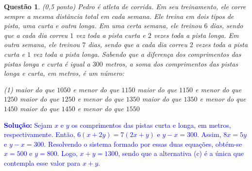 \documentclass[oneside,a4paper,12pt]{article}
\newcommand{\negrito}[1]{\mbox{\boldmath{$#1$}}}
\theoremstyle{Colorido}
\theoremstyle{solu}
\theoremstyle{dotlessP}
\newtheorem{sol}{Questão}
\begin{document}
	\begin{sol}
\textit{(0,5 ponto)} \newline \newline
Pedro é atleta de corrida. Em seu treinamento, ele corre sempre a mesma distância total em cada semana. Ele treina em dois tipos de pista, uma curta e outra longa. Em uma certa semana, ele treinou $6$ dias, sendo que a cada dia correu $1$ vez toda a pista curta e $2$ vezes toda a pista longa. Em outra semana, ele treinou $7$ dias, sendo que a cada dia correu $2$ vezes toda a pista curta e $1$ vez toda a pista longa. Sabendo que a diferença dos comprimentos das pistas longa e curta é igual a $300$ metros, a soma dos comprimentos das pistas longa e curta, em metros, é um número:
\begin{tasks}[counter-format={(tsk[a])},label-width=3.6ex, label-format = {\bfseries}, column-sep = {20pt}](1)
\task[\textcolor{blue}{$\negrito{(a)} $}] maior do que $1050$ e menor do que $1150$
\task[\textcolor{blue}{$\negrito{(b)} $}] maior do que $1150$ e menor do que $1250$
\task[\textcolor{blue}{$\negrito{(c)} $}] maior do que $1250$ e menor do que $1350$      
\task[\textcolor{blue}{$\negrito{(d)} $}] maior do que $1350$ e menor do que $1450$
\task[\textcolor{blue}{$\negrito{(e)} $}] maior do que $1450$ e menor do que $1550$
\end{tasks}
\end{sol}
\textcolor{blue}{\textbf{Solução:} Sejam $x$ e $y$ os comprimentos das pistas curta e longa, em metros, respectivamente. Então, $6(x+2y)=7(2x+y)$ e $y-x=300$. Assim, $8x=5y$ e $y-x=300$. Resolvendo o sistema formado por essas duas equações, obtém-se $x=500$ e $y=800$. Logo, $x+y=1300$, sendo que a alternativa (c) é a única que contempla esse valor para $x+y$.
}
\newpage
\end{document}
